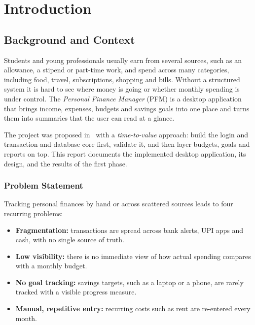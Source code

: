 \documentclass{tietreport}
\author{%
  \texttt{1024030022} Arjun Puri \\
  \texttt{1024030105} Anshdeep Singh%
}
\begin{document}
\raggedbottom

\let\cleardoublepage\clearpage

\maketitle

\tableofcontents
\listoffigures
\listoftables


\chapter{Introduction}

\section{Background and Context}

Students and young professionals usually earn from several
sources, such as an allowance, a stipend or part-time work, and
spend across many categories, including food, travel,
subscriptions, shopping and bills. Without a structured system it
is hard to see where money is going or whether monthly spending is
under control. The \emph{Personal Finance Manager} (PFM) is a
desktop application that brings income, expenses, budgets and
savings goals into one place and turns them into summaries that
the user can read at a glance.

The project was proposed in~\cite{pfmproposal} with a
\emph{time-to-value} approach: build the login and
transaction-and-database core first, validate it, and then layer
budgets, goals and reports on top. This report documents the
implemented desktop application, its design, and the results of
the first phase.

\subsection{Problem Statement}

Tracking personal finances by hand or across scattered sources
leads to four recurring problems:

\begin{itemize}
  \item \textbf{Fragmentation:} transactions are spread across
    bank alerts, UPI apps and cash, with no single source of truth.
  \item \textbf{Low visibility:} there is no immediate view of how
    actual spending compares with a monthly budget.
  \item \textbf{No goal tracking:} savings targets, such as a
    laptop or a phone, are rarely tracked with a visible progress
    measure.
  \item \textbf{Manual, repetitive entry:} recurring costs such as
    rent are re-entered every month.
\end{itemize}
\end{document}
